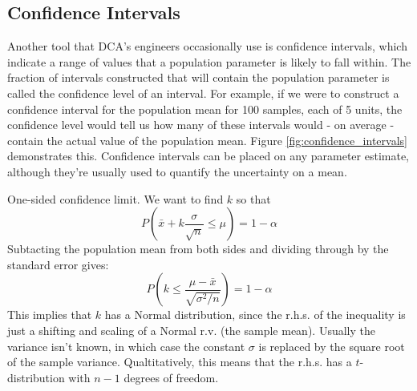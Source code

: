 \documentclass[11pt,a4paper,article]{memoir} %
\begin{document}
\subsection*{Confidence Intervals}
Another tool that DCA's engineers occasionally use is confidence intervals, which indicate a range of values that a population parameter is likely to fall within. The fraction of intervals constructed that will contain the population parameter is called the confidence level of an interval. For example, if we were to construct a confidence interval for the population mean for 100 samples, each of 5 units, the confidence level would tell us how many of these intervals would - on average - contain the actual value of the population mean. Figure \ref{fig:confidence_intervals} demonstrates this. Confidence intervals can be placed on any parameter estimate, although they're usually used to quantify the uncertainty on a mean. 
\par
One-sided confidence limit. 
We want to find $k$ so that
\[
	P(\bar{x} + k\frac{\sigma}{\sqrt{n}} \leq \mu) = 1 - \alpha
\]
Subtacting the population mean from both sides and dividing through by the standard error gives:
\[
	P(k \leq \frac{\mu - \bar{x}}{\sqrt{\sigma^2/n}}) = 1 - \alpha
\]
This implies that $k$ has a Normal distribution, since the r.h.s. of the inequality is just a shifting and scaling of a Normal r.v. (the sample mean). Usually the variance isn't known, in which case the constant $\sigma$ is replaced by the square root of the sample variance. Qualtitatively, this means that the r.h.s. has a $t$-distribution with $n - 1$ degrees of freedom.

\newpage
\end{document}
